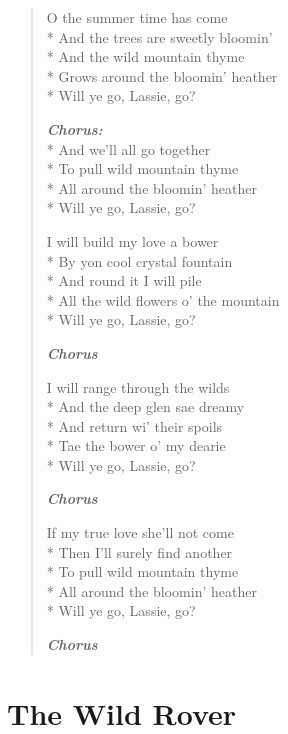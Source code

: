 \documentclass[9pt,twoside]{extarticle}
\newenvironment{xverse}{
	\begin{verse}
	\fontsize{8.5}{10.5}\selectfont
	}
	{
	\end{verse}
	\penalty 0
}
\newcommand{\chorusdef}{\textbf{\emph{Chorus:}}\\*}
\newcommand{\chorusmark}[1][1]{%
\vspace{-0.5\stanzaskip}%
\textbf{\emph{Chorus \ifthenelse{\equal{#1}{1}}{}{$\times$ #1}}}%
\vspace{-0.5\stanzaskip}%
}
\begin{document}
\begin{xverse}
O the summer time has come \\*
And the trees are sweetly bloomin’ \\*
And the wild mountain thyme \\*
Grows around the bloomin’ heather \\*
Will ye go, Lassie, go?

\chorusdef
And we’ll all go together \\*
To pull wild mountain thyme \\*
All around the bloomin’ heather \\*
Will ye go, Lassie, go?

I will build my love a bower \\*
By yon cool crystal fountain \\*
And round it I will pile \\*
All the wild flowers o’ the mountain \\*
Will ye go, Lassie, go?

\chorusmark

I will range through the wilds \\*
And the deep glen sae dreamy \\*
And return wi’ their spoils \\*
Tae the bower o’ my dearie \\*
Will ye go, Lassie, go?

\chorusmark

If my true love she’ll not come \\*
Then I’ll surely find another \\*
To pull wild mountain thyme \\*
All around the bloomin’ heather \\*
Will ye go, Lassie, go?

\chorusmark
\end{xverse}

\section{The Wild Rover}
\end{document}

